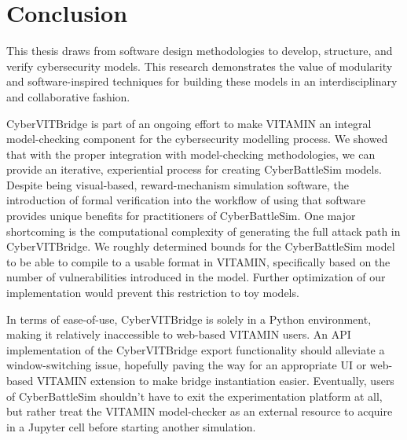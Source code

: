 \section{Conclusion}

This thesis draws from software design methodologies to develop, structure, and verify cybersecurity models. This research demonstrates the value of modularity and software-inspired techniques for building these models in an interdisciplinary and collaborative fashion. 

CyberVITBridge is part of an ongoing effort to make VITAMIN an integral model-checking component for the cybersecurity modelling process. We showed that with the proper integration with model-checking methodologies, we can provide an iterative, experiential process for creating CyberBattleSim models. Despite being visual-based, reward-mechanism simulation software, the introduction of formal verification into the workflow of using that software provides unique benefits for practitioners of CyberBattleSim. One major shortcoming is the computational complexity of generating the full attack path in CyberVITBridge. We roughly determined bounds for the CyberBattleSim model to be able to compile to a usable format in VITAMIN, specifically based on the number of vulnerabilities introduced in the model. Further optimization of our implementation would prevent this restriction to toy models. 

In terms of ease-of-use, CyberVITBridge is solely in a Python environment, making it relatively inaccessible to web-based VITAMIN users. An API implementation of the CyberVITBridge export functionality should alleviate a window-switching issue, hopefully paving the way for an appropriate UI or web-based VITAMIN extension to make bridge instantiation easier. Eventually, users of CyberBattleSim shouldn't have to exit the experimentation platform at all, but rather treat the VITAMIN model-checker as an external resource to acquire in a Jupyter cell before starting another simulation.

